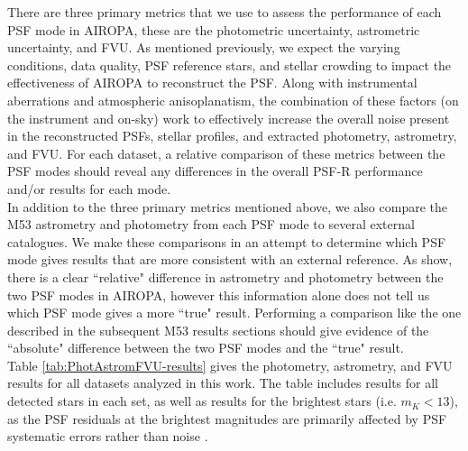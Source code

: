 \documentclass[]{spie}  %
\begin{document}
\indent There are three primary metrics that we use to assess the performance of each PSF mode in AIROPA, these are the photometric uncertainty, astrometric uncertainty, and FVU. As mentioned previously, we expect the varying conditions, data quality, PSF reference stars, and stellar crowding to impact the effectiveness of AIROPA to reconstruct the PSF. Along with instrumental aberrations and atmospheric anisoplanatism, the combination of these factors (on the instrument and on-sky) work to effectively increase the overall noise present in the reconstructed PSFs, stellar profiles, and extracted photometry, astrometry, and FVU. For each dataset, a relative comparison of these metrics between the PSF modes should reveal any differences in the overall PSF-R performance and/or results for each mode. 
\\
\indent In addition to the three primary metrics mentioned above, we also compare the M53 astrometry and photometry from each PSF mode to several external catalogues. We make these comparisons in an attempt to determine which PSF mode gives results that are more consistent with an external reference. As \cite{Turri:inprep} show, there is a clear ``relative" difference in astrometry and photometry between the two PSF modes in AIROPA, however this information alone does not tell us which PSF mode gives a more ``true" result. Performing a comparison like the one described in the subsequent M53 results sections should give evidence of the ``absolute" difference between the two PSF modes and the ``true" result.
\\
\indent Table \ref{tab:PhotAstromFVU-results} gives the photometry, astrometry, and FVU results for all datasets analyzed in this work. The table includes results for all detected stars in each set, as well as results for the brightest stars (i.e. $m_K < 13$), as the PSF residuals at the brightest magnitudes are primarily affected by PSF systematic errors rather than noise \cite{Turri:inprep}. 
\end{document}
